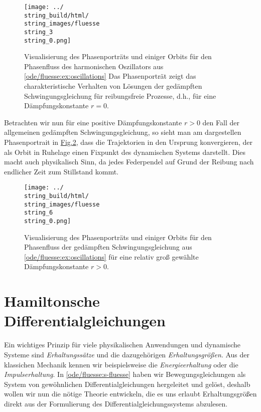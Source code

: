 \documentclass[letterpaper,10pt,english]{jupyterBook}
\begin{document}
\begin{figure}[htbp]
\centering


\noindent\texttt{[image: ../\\string\_build/html/\\string\_images/fluesse\\string\_3\\string\_0.png]}
\caption{Visualisierung des Phasenporträts und einiger Orbits für den Phasenfluss des harmonischen Oszillators aus \cref{ode/fluesse:ex:oscillations}  Das Phasenporträt zeigt das charakteristische Verhalten von Lösungen der gedämpften Schwingungsgleichung für reibungsfreie Prozesse, d.h., für eine Dämpfungskonstante \(r = 0\).}\label{\detokenize{ode/fluesse:fig-harmonic-oscillator}}\end{figure}

\par
Betrachten wir nun für eine positive Dämpfungskonstante \(r > 0\) den Fall der allgemeinen gedämpften Schwingungsgleichung, so sieht man am dargestellen Phasenportrait in \hyperref[\detokenize{ode/fluesse:fig-damped-oscillator}]{Fig.\@ \ref{\detokenize{ode/fluesse:fig-damped-oscillator}}}, dass die Trajektorien in den Ursprung konvergieren, der als Orbit in Ruhelage einen Fixpunkt des dynamischen Systems darstellt.
Dies macht auch physikalisch Sinn, da jedes Federpendel auf Grund der Reibung nach endlicher Zeit zum Stillstand kommt.

\begin{figure}[htbp]
\centering


\noindent\texttt{[image: ../\\string\_build/html/\\string\_images/fluesse\\string\_6\\string\_0.png]}
\caption{Visualisierung des Phasenporträts und einiger Orbits für den Phasenfluss der gedämpften Schwingungsgleichung aus \cref{ode/fluesse:ex:oscillations} für eine relativ groß gewählte Dämpfungskonstante \(r > 0\).}\label{\detokenize{ode/fluesse:fig-damped-oscillator}}\end{figure}


\section{Hamiltonsche Differentialgleichungen}
\label{\detokenize{ode/hamilton:hamiltonsche-differentialgleichungen}}\label{\detokenize{ode/hamilton::doc}}
\par
Ein wichtiges Prinzip für viele physikalischen Anwendungen und dynamische Systeme sind \emph{Erhaltungssätze} und die dazugehörigen \emph{Erhaltungsgrößen}.
Aus der klassichen Mechanik kennen wir beispielsweise die \emph{Energieerhaltung} oder die \emph{Impulserhaltung}.
In \cref{ode/fluesse:s-fluesse}  haben wir Bewegungsgleichungen als System von gewöhnlichen Differentialgleichungen hergeleitet und gelöst, deshalb wollen wir nun die nötige Theorie entwickeln, die es uns erlaubt Erhaltungsgrößen direkt aus der Formulierung des Differentialgleichungssystems abzulesen.
\end{document}
